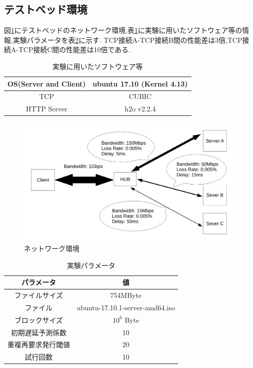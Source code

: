 \documentclass[a4j,12pt]{gradthesis_utf8}
\begin{document}
\subsection{テストベッド環境}
\label{testbed}
図\ref{network}にテストベッドのネットワーク環境,表\ref{env}に実験に用いたソフトウェア等の情報,実験パラメータを表\ref{param}に示す.
TCP接続A-TCP接続B間の性能差は3倍,TCP接続A-TCP接続C間の性能差は10倍である.

\begin{table}[htb]
	\begin{center}
		\caption{実験に用いたソフトウェア等}
		\label{env}
		\begin{tabular}{|c|c|} \hline
			OS(Server and Client) & ubuntu 17.10 (Kernel 4.13)\\ \hline
			TCP & CUBIC \\ \hline
			HTTP Server & h2o v2.2.4 \\ \hline
		\end{tabular}
	\end{center}
\end{table}

\begin{figure}[h]
	\centering
	\label{network}
	\includegraphics[width=16cm]{figure/test_network.pdf}
	\caption{ネットワーク環境}
\end{figure}

\begin{table}[htb]
	\begin{center}
		\caption{実験パラメータ}
		\label{param}
		\begin{tabular}{|c|c|} \hline
			パラメータ & 値\\ \hline \hline
			ファイルサイズ & 754MByte\\ \hline
			ファイル &  ubuntu-17.10.1-server-amd64.iso\\ \hline
			ブロックサイズ & \(10^6\) Byte\\ \hline
			初期遅延予測係数 & 10 \\ \hline
			重複再要求発行閾値 & 20 \\ \hline
			試行回数 & 10 \\ \hline
		\end{tabular}
	\end{center}
\end{table}
\end{document}
